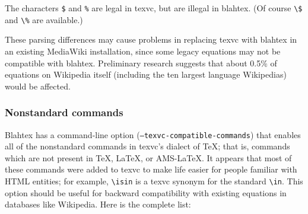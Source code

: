 \documentclass{article}
\newcommand{\texcommand}[1]{\textbackslash{}#1}
\begin{document}
The characters \texttt{\$} and \texttt{\%} are legal in texvc, but are illegal in blahtex. (Of course \texttt{\texcommand{\$}} and \texttt{\texcommand{\%}} are available.)

These parsing differences may cause problems in replacing texvc with blahtex in an existing MediaWiki installation, since some legacy equations may not be compatible with blahtex. Preliminary research suggests that about 0.5\% of equations on Wikipedia itself (including the ten largest language Wikipedias) would be affected.

\subsubsection{Nonstandard commands}\label{sec:texvc-compatible-commands}

Blahtex has a command-line option (\texttt{--texvc-compatible-commands}) that enables all of the nonstandard commands in texvc's dialect of \TeX{}; that is, commands which are not present in \TeX{}, \LaTeX{}, or AMS-\LaTeX{}. It appears that most of these commands were added to texvc to make life easier for people familiar with HTML entities; for example, \texttt{\texcommand{isin}} is a texvc synonym for the standard \texttt{\texcommand{in}}. This option should be useful for backward compatibility with existing equations in databases like Wikipedia. Here is the complete list:
\end{document}
